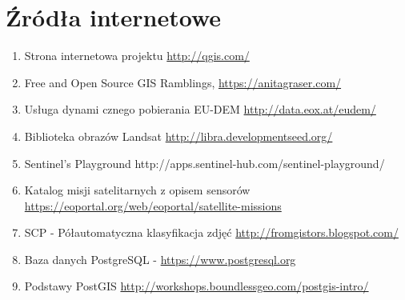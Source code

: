 \documentclass[12pt,a4paper]{book}
\begin{document}
\section{Źródła internetowe}
\begin{enumerate}
\item Strona internetowa projektu \url{http://qgis.com/}
\item Free and Open Source GIS Ramblings, \url{https://anitagraser.com/}
\item Usługa dynami cznego pobierania EU-DEM \url{http://data.eox.at/eudem/}
\item Biblioteka obrazów Landsat \url{http://libra.developmentseed.org/}
\item Sentinel’s Playground http://apps.sentinel-hub.com/sentinel-playground/
\item Katalog misji satelitarnych z opisem sensorów 
\\ \url{https://eoportal.org/web/eoportal/satellite-missions}
\item SCP - Półautomatyczna klasyfikacja zdjęć \url{http://fromgistors.blogspot.com/}
\item Baza danych PostgreSQL - \url{https://www.postgresql.org}
\item Podstawy PostGIS \url{http://workshops.boundlessgeo.com/postgis-intro/}
\end{enumerate}

\printbibliography
\setcounter{tocdepth}{10}
\renewcommand\contentsname{Spis treści}
\tableofcontents
\end{document}
